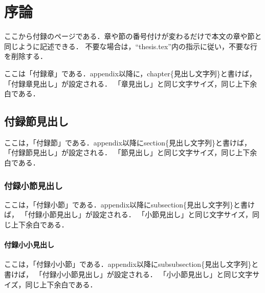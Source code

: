 \documentclass[11pt]{icsthesis}
\begin{document}
\chapter{序論}
ここから付録のページである．章や節の番号付けが変わるだけで本文の章や節と同じように記述できる．
不要な場合は，``\textsf{thesis.tex}''内の指示に従い，不要な行を削除する．

ここは「付録章」である．\textsf{\yen appendix}以降に，\textsf{\yen chapter\{見出し文字列\}}と書けば，
「付録章見出し」が設定される．
「章見出し」と同じ文字サイズ，同じ上下余白である．

\section{付録節見出し}
ここは，「付録節」である．\textsf{\yen appendix}以降に\textsf{\yen section\{見出し文字列\}}と書けば，
「付録節見出し」が設定される．
「節見出し」と同じ文字サイズ，同じ上下余白である．

\subsection{付録小節見出し}
ここは，「付録小節」である．\textsf{\yen appendix}以降に\textsf{\yen subsection\{見出し文字列\}}と書けば，
「付録小節見出し」が設定される．
「小節見出し」と同じ文字サイズ，同じ上下余白である．

\subsubsection{付録小小見出し}
ここは，「付録小小節」である．\textsf{\yen appendix}以降に\textsf{\yen subsubsection\{見出し文字列\}}と書けば，
「付録小小節見出し」が設定される．
「小小節見出し」と同じ文字サイズ，同じ上下余白である．
\end{document}
